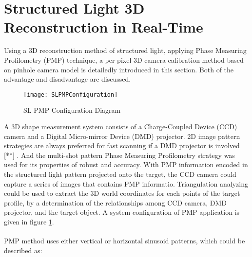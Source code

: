 \section{Structured Light 3D Reconstruction in Real-Time}
\label{sectionSL3DReconstructionRealTime}
Using a 3D reconstruction method of structured light, applying Phase Measuring Profilometry (PMP) technique, a per-pixel 3D camera calibration method based on pinhole camera model is detailedly introduced in this section. Both of the advantage and disadvantage are discussed.
%
%
\begin{figure}[H]
\centering
\texttt{[image: SLPMPConfiguration]}
\caption{SL PMP Configuration Diagram \cite{Song06}}
\label{SLPMPConfiguration}
\end{figure}%
%
A 3D shape measurement system consists of a Charge-Coupled Device (CCD) camera and a Digital Micro-mirror Device (DMD) projector. 2D image pattern strategies are always preferred for fast scanning if a DMD projector is involved
[**]%
 \cite{Song06}.
And the multi-shot pattern Phase Measuring Profilometry strategy was used for its properties of robust and accuracy.
With PMP information encoded in the structured light pattern projected onto the target, the CCD camera could capture a series of images that contains PMP informatio. Triangulation analyzing could be used to extract the 3D world coordinates for each points of the target profile, by a determination of the relationships among CCD camera, DMD projector, and the target object. A system configuration of PMP application is given in figure \ref{SLPMPConfiguration}.%
\\\\%
PMP method uses either vertical or horizontal sinusoid patterns, which could be described as:

